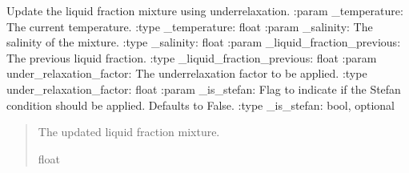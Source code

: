 \documentclass[a4paper,11pt,english,openany]{sphinxmanual}
\begin{document}
\begin{fulllineitems}
\label{\detokenize{api/spyice.update_physical_values:src.spyice.update_physical_values.update_liquid_fraction_mixture_with_under_relaxation}}
\pysigstartsignatures
\pysiglinewithargsret
{}
{\sphinxparamcomma {}\sphinxparamcomma {}\sphinxparamcomma {}\sphinxparamcomma {}}
{}
\pysigstopsignatures
\sphinxAtStartPar
Update the liquid fraction mixture using under\sphinxhyphen{}relaxation.
:param \_temperature: The current temperature.
:type \_temperature: float
:param \_salinity: The salinity of the mixture.
:type \_salinity: float
:param \_liquid\_fraction\_previous: The previous liquid fraction.
:type \_liquid\_fraction\_previous: float
:param under\_relaxation\_factor: The under\sphinxhyphen{}relaxation factor to be applied.
:type under\_relaxation\_factor: float
:param \_is\_stefan: Flag to indicate if the Stefan condition should be applied. Defaults to False.
:type \_is\_stefan: bool, optional
\begin{quote}\begin{description}
\sphinxAtStartPar
The updated liquid fraction mixture.

\sphinxAtStartPar
float

\end{description}\end{quote}

\end{fulllineitems}

\end{document}
